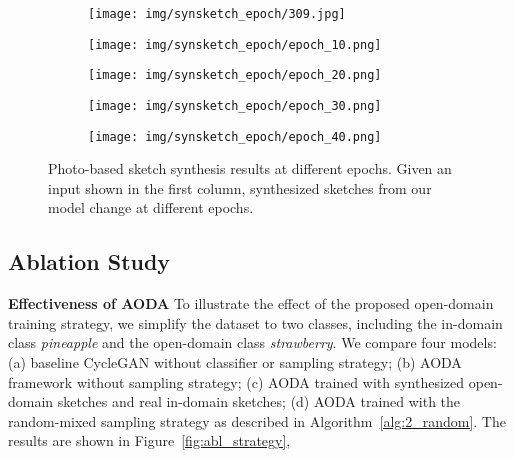 \documentclass[10pt,twocolumn,letterpaper]{article}
\begin{document}
\begin{figure}[tbp]
\begin{center}
  \begin{subfigure}[b]{\ptsewidth\linewidth}
  \texttt{[image: img/synsketch\_epoch/309.jpg]}
  \end{subfigure}
  \begin{subfigure}[b]{\ptsewidth\linewidth}
  \texttt{[image: img/synsketch\_epoch/epoch\_10.png]}
  \end{subfigure}
\begin{subfigure}[b]{\ptsewidth\linewidth}
  \texttt{[image: img/synsketch\_epoch/epoch\_20.png]}
  \end{subfigure}
  \begin{subfigure}[b]{\ptsewidth\linewidth}
  \texttt{[image: img/synsketch\_epoch/epoch\_30.png]}
  \end{subfigure}
  \begin{subfigure}[b]{\ptsewidth\linewidth}
  \texttt{[image: img/synsketch\_epoch/epoch\_40.png]}
  \end{subfigure}
\end{center}
\caption{Photo-based sketch synthesis results at different epochs. Given an input shown in the first column, synthesized sketches from our model change at different epochs.}
 \label{fig:p2s_epoch}
\end{figure}

\subsection{Ablation Study}
\label{sec:exp_abl}



\noindent \textbf{Effectiveness of AODA} To illustrate the effect of the proposed open-domain training strategy, we simplify the dataset to two classes, including the in-domain class \textit{pineapple} and the open-domain class \textit{strawberry}. We compare four models: (a) baseline CycleGAN without classifier or sampling strategy; (b) AODA framework without sampling strategy; (c) AODA trained with synthesized open-domain sketches and real in-domain sketches; (d) AODA trained with the random-mixed sampling strategy as described in Algorithm~\ref{alg:2_random}. The results are shown in Figure~\ref{fig:abl_strategy},
\end{document}
